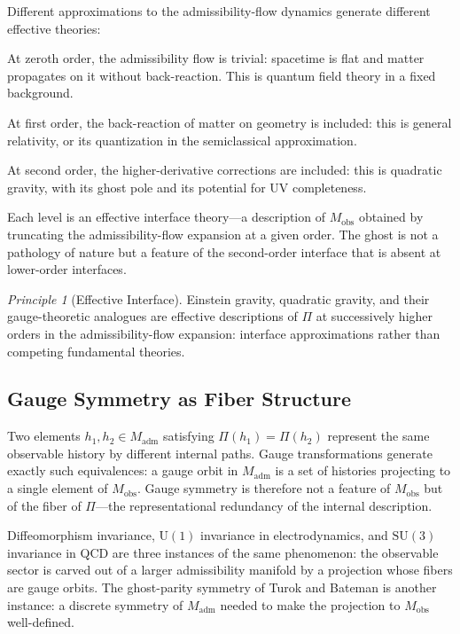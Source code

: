 \documentclass[12pt,a4paper]{article}
\theoremstyle{remark}
\newtheorem{principle}{Principle}[section]
\begin{document}
Different approximations to the admissibility-flow dynamics generate
different effective theories:

At zeroth order, the admissibility flow is trivial: spacetime is flat
and matter propagates on it without back-reaction. This is quantum field
theory in a fixed background.

At first order, the back-reaction of matter on geometry is included:
this is general relativity, or its quantization in the semiclassical
approximation.

At second order, the higher-derivative corrections are included: this is
quadratic gravity, with its ghost pole and its potential for UV completeness.

Each level is an effective interface theory---a description of $M_{\mathrm{obs}}$
obtained by truncating the admissibility-flow expansion at a given order.
The ghost is not a pathology of nature but a feature of the second-order
interface that is absent at lower-order interfaces.

\begin{principle}[Effective Interface]
Einstein gravity, quadratic gravity, and their gauge-theoretic analogues
are effective descriptions of $\Pi$ at successively higher orders in the
admissibility-flow expansion: interface approximations rather than
competing fundamental theories.
\end{principle}

\subsection{Gauge Symmetry as Fiber Structure}

Two elements $h_1, h_2 \in M_{\mathrm{adm}}$ satisfying $\Pi(h_1) = \Pi(h_2)$
represent the same observable history by different internal paths. Gauge
transformations generate exactly such equivalences: a gauge orbit in
$M_{\mathrm{adm}}$ is a set of histories projecting to a single element of
$M_{\mathrm{obs}}$. Gauge symmetry is therefore not a feature of $M_{\mathrm{obs}}$
but of the fiber of $\Pi$---the representational redundancy of the internal
description.

Diffeomorphism invariance, $\mathrm{U}(1)$ invariance in electrodynamics,
and $\mathrm{SU}(3)$ invariance in QCD are three instances of the same
phenomenon: the observable sector is carved out of a larger admissibility
manifold by a projection whose fibers are gauge orbits. The ghost-parity
symmetry of Turok and Bateman is another instance: a discrete symmetry of
$M_{\mathrm{adm}}$ needed to make the projection to $M_{\mathrm{obs}}$ well-defined.
\end{document}
